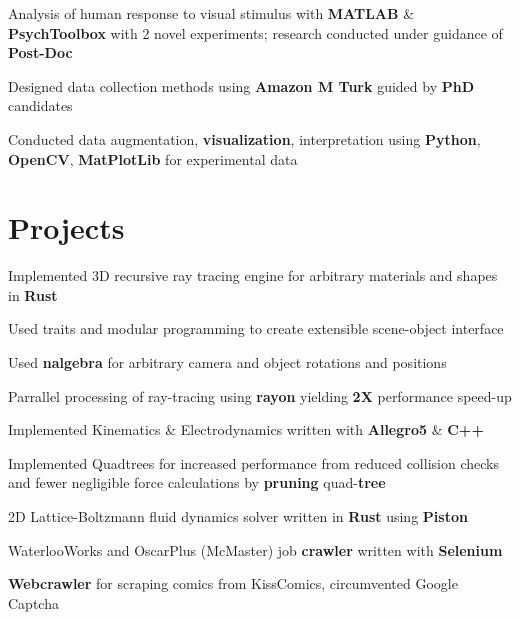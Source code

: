 \documentclass[]{chandan-cv}
\begin{document}
\begin{minipage}[t]{0.71\textwidth}
\begin{tightemize}
	\item Analysis of human response to visual stimulus with \textbf{MATLAB} \& \textbf{PsychToolbox} with 2 novel experiments; research conducted under guidance of \textbf{Post-Doc}
	\item Designed data collection methods using \textbf{Amazon M Turk} guided by \textbf{PhD} candidates
	\item Conducted data augmentation, \textbf{visualization}, interpretation using \textbf{Python}, \textbf{OpenCV}, \textbf{MatPlotLib} for experimental data
\end{tightemize}
\sectionsep


\section{Projects}

\descript{ }
\location{ }
\begin{tightemize}
	\item Implemented 3D recursive ray tracing engine for arbitrary materials and shapes in \textbf{Rust}
	\item Used traits and modular programming to create extensible scene-object interface
	\item Used \textbf{nalgebra} for arbitrary camera and object rotations and positions
	\item Parrallel processing of ray-tracing using \textbf{rayon} yielding \textbf{2X} performance speed-up
\end{tightemize}
\sectionsep

\descript{ }
\location{ }
\begin{tightemize}
	\item Implemented Kinematics \& Electrodynamics written with \textbf{Allegro5} \& \textbf{C++}
	\item Implemented Quadtrees for increased performance from reduced collision checks and fewer 
	negligible force calculations by \textbf{pruning} quad-\textbf{tree}
\end{tightemize}
\sectionsep

\descript{ }
\location{ }
\begin{tightemize}
	\item 2D Lattice-Boltzmann fluid dynamics solver written in \textbf{Rust} using \textbf{Piston}
	\item WaterlooWorks and OscarPlus (McMaster) job \textbf{crawler} written with \textbf{Selenium}
	\item \textbf{Webcrawler} for scraping comics from KissComics, circumvented Google Captcha
\end{tightemize}
\sectionsep


\end{minipage}
\end{document}
